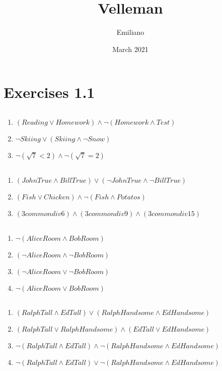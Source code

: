 \documentclass{article}
\title{Velleman}
\author{Emiliano}
\date{March 2021}
\begin{document}
\maketitle

\section{Exercises 1.1}
\subsection{}
\begin{enumerate}[label=(\alph*)]
  \item $(Reading \vee  Homework) \wedge \neg(Homework \wedge Test )$
  \item $ \neg Skiing \vee (Skiing \wedge \neg Snow) $
  \item $\neg(\sqrt{7} < 2) \wedge \neg(\sqrt{7} = 2)$
\end{enumerate}
\subsection{}
\begin {enumerate}[label=(\alph*)]
  \item $(JohnTrue \wedge BillTrue) \vee (\neg JohnTrue \wedge \neg BillTrue)$
  \item $(Fish\vee Chicken) \wedge \neg (Fish \wedge Potatos) $
  \item $(3 commondiv 6) \wedge (3 commondiv 9) \wedge (3 commondiv 15)$
\end{enumerate}
\subsection{}
\begin{enumerate}[label=(\alph*)]
  \item $\neg (AliceRoom \wedge BobRoom)$
  \item $(\neg AliceRoom \wedge \neg BobRoom)$
  \item $(\neg AliceRoom \vee \neg BobRoom)$
  \item $\neg( AliceRoom \vee  BobRoom)$
\end{enumerate}
\subsection{}
\begin{enumerate}[label=(\alph*)]
  \item $(RalphTall \wedge EdTall)\vee (RalphHandsome \wedge EdHandsome)$
  \item $(RalphTall \vee RalphHandsome)\wedge (EdTall \vee EdHandsome)$
  \item $\neg (RalphTall \wedge EdTall)\wedge \neg(RalphHandsome \wedge EdHandsome)$
  \item $\neg (RalphTall \wedge EdTall)\vee \neg(RalphHandsome \wedge EdHandsome)$
\end{enumerate}
\end{document}
